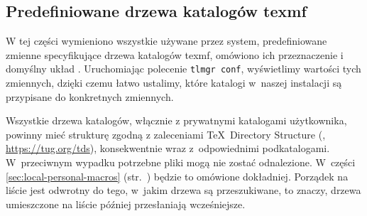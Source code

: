 \documentclass{article}
\begin{document}
\subsection{Predefiniowane drzewa katalogów texmf}
\label{sec:texmftrees}

W tej części wymieniono wszystkie używane przez system, predefiniowane
zmienne specyfikujące drzewa katalogów texmf, omówiono ich przeznaczenie i domyślny układ \TL{}.
Uruchomiając polecenie \texttt{tlmgr~conf}, wyświetlimy wartości tych
zmiennych, dzięki czemu łatwo ustalimy, które katalogi w~naszej instalacji są
przypisane do konkretnych zmiennych.

Wszystkie drzewa katalogów, włącznie z prywatnymi katalogami użytkownika,
powinny mieć strukturę zgodną z zaleceniami \TeX\
Directory Structure (\TDS, \url{https://tug.org/tds}), konsekwentnie wraz
z~odpowiednimi podkatalogami. W~przeciwnym wypadku potrzebne pliki mogą nie
zostać odnalezione. W~części \ref{sec:local-personal-macros}
(str.~\pageref{sec:local-personal-macros}) będzie to omówione dokładniej.
Porządek na liście jest odwrotny do tego, w~jakim drzewa są przeszukiwane, to
znaczy, drzewa umieszczone na liście później przesłaniają wcześniejsze.
\end{document}
